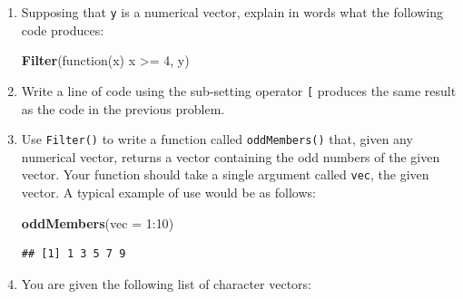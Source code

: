 \documentclass[]{book}
\makeatletter
\newenvironment{Shaded}{\begin{snugshade}}{\end{snugshade}}
\newcommand{\KeywordTok}[1]{\textcolor[rgb]{0.13,0.29,0.53}{\textbf{{#1}}}}
\newcommand{\DataTypeTok}[1]{\textcolor[rgb]{0.13,0.29,0.53}{{#1}}}
\newcommand{\DecValTok}[1]{\textcolor[rgb]{0.00,0.00,0.81}{{#1}}}
\newcommand{\StringTok}[1]{\textcolor[rgb]{0.31,0.60,0.02}{{#1}}}
\newcommand{\NormalTok}[1]{{#1}}
\newenvironment{kframe}{%
\medskip{}
\setlength{\fboxsep}{.8em}
 \def\at@end@of@kframe{}%
 \ifinner\ifhmode%
  \def\at@end@of@kframe{\end{minipage}}%
  \begin{minipage}{\columnwidth}%
 \fi\fi%
 \def\FrameCommand##1{\hskip\@totalleftmargin \hskip-\fboxsep
 \colorbox{shadecolor}{##1}\hskip-\fboxsep
     \hskip-\linewidth \hskip-\@totalleftmargin \hskip\columnwidth}%
 \MakeFramed {\advance\hsize-\width
   \@totalleftmargin\z@ \linewidth\hsize
   \@setminipage}}%
 {\par\unskip\endMakeFramed%
 \at@end@of@kframe}
\renewenvironment{Shaded}{\begin{kframe}}{\end{kframe}}
\theoremstyle{definition}
\theoremstyle{definition}
\theoremstyle{remark}
\makeatother
\begin{document}
{\begin{enumerate}
\begin{Shaded}
\begin{Highlighting}[]
  \NormalTok{lst <-}\StringTok{ }\KeywordTok{vector}\NormalTok{(}\DataTypeTok{mode =} \StringTok{"list"}\NormalTok{, }\DataTypeTok{length =} \KeywordTok{length}\NormalTok{(vecs))}
  \NormalTok{for ( i in }\KeywordTok{seq_along}\NormalTok{(vecs) ) \{}
    \NormalTok{lst[[i]] <-}\StringTok{ }\KeywordTok{runif}\NormalTok{(vecs[i], }\DataTypeTok{min =} \NormalTok{lower[i], }\DataTypeTok{max =} \NormalTok{upper[i])}
  \NormalTok{\}}
  \NormalTok{lst}
\NormalTok{\}}
\end{Highlighting}
\end{Shaded}

  Use \texttt{Map()} to refactor the code for \texttt{randomSims2()} so
  as to avoid using the loop.
\item
  Supposing that \texttt{y} is a numerical vector, explain in words what
  the following code produces:

\begin{Shaded}
\begin{Highlighting}[]
\KeywordTok{Filter}\NormalTok{(function(x) x >=}\StringTok{ }\DecValTok{4}\NormalTok{, y)}
\end{Highlighting}
\end{Shaded}
\item
  Write a line of code using the sub-setting operator \texttt{{[}}
  produces the same result as the code in the previous problem.
\item
  Use \texttt{Filter()} to write a function called \texttt{oddMembers()}
  that, given any numerical vector, returns a vector containing the odd
  numbers of the given vector. Your function should take a single
  argument called \texttt{vec}, the given vector. A typical example of
  use would be as follows:

\begin{Shaded}
\begin{Highlighting}[]
\KeywordTok{oddMembers}\NormalTok{(}\DataTypeTok{vec =} \DecValTok{1}\NormalTok{:}\DecValTok{10}\NormalTok{)}
\end{Highlighting}
\end{Shaded}

\begin{verbatim}
## [1] 1 3 5 7 9
\end{verbatim}
\item
  You are given the following list of character vectors:


\end{enumerate}}
\end{document}
